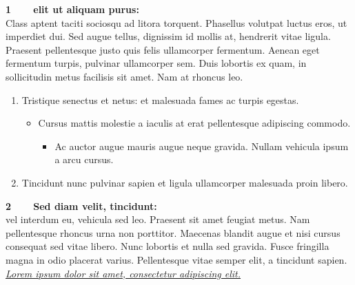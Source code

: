 \documentclass{article}
\begin{document}
\begin{flushleft}
    {\bf \Large 1\ \ \ \ elit ut aliquam purus:}\\
    \Large Class aptent taciti sociosqu ad litora torquent.
    Phasellus volutpat luctus eros, ut imperdiet dui.
    Sed augue tellus, dignissim id mollis at, hendrerit vitae ligula.
    Praesent pellentesque justo quis felis ullamcorper fermentum.
    Aenean eget fermentum turpis, pulvinar ullamcorper sem.
    Duis lobortis ex quam, in sollicitudin metus facilisis sit amet. Nam at rhoncus leo.
    \begin{enumerate}
        \item [1.] Tristique senectus et netus: et malesuada fames ac turpis egestas.
              \begin{itemize}
                  \item Cursus mattis molestie a iaculis at erat pellentesque adipiscing commodo.
                        \begin{itemize}
                            \item Ac auctor augue mauris augue neque gravida. Nullam vehicula ipsum a arcu cursus.
                        \end{itemize}
              \end{itemize}
        \item [2.] Tincidunt nunc pulvinar sapien et ligula ullamcorper malesuada proin libero.
    \end{enumerate}
    \vspace{.5cm}
    {\bf \Large 2\ \ \ \ Sed diam velit, tincidunt:}\\
    \Large vel interdum eu, vehicula sed leo.
    Praesent sit amet feugiat metus. Nam pellentesque rhoncus urna non porttitor.
    Maecenas blandit augue et nisi cursus consequat sed vitae libero.
    Nunc lobortis et nulla sed gravida. Fusce fringilla magna in odio placerat varius.
    Pellentesque vitae semper elit, a tincidunt sapien.\\
    \vspace{.5cm}
    {\em \underline{Lorem ipsum dolor sit amet, consectetur adipiscing elit.}}
\end{flushleft}
\end{document}
